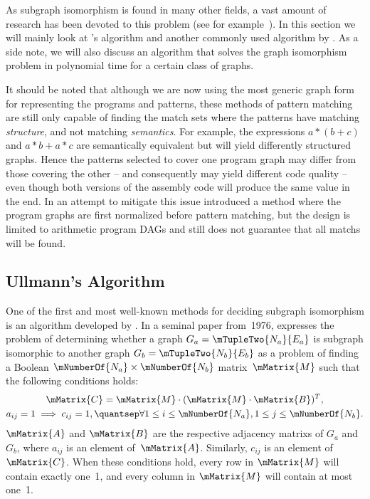 As \gls{subgraph isomorphism} is found in many other fields, a vast amount of
research has been devoted to this problem (see for
example~).
%
In this section we
will mainly look at \citeauthor{Ullmann1976}'s algorithm and another commonly
used algorithm by \citeauthor{Cordella2001}.
%
As a side note, we will also
discuss an algorithm that solves the \gls{graph isomorphism} problem in
polynomial time for a certain class of \glspl{graph}.

It should be noted that although we are now using the most generic \gls{graph}
form for representing the \glspl{program} and \glspl{pattern}, these methods of
\gls{pattern matching} are still only capable of finding the \glspl{match set}
where the \glspl{pattern} have matching \emph{structure}, and not matching
\emph{semantics}.
%
For example, the expressions \mbox{$a * (b + c)$} and \mbox{$a
  * b + a * c$} are semantically equivalent but will yield differently
structured \glspl{graph}.
%
Hence the \glspl{pattern} selected to cover one
\gls{program graph} may differ from those covering the other -- and consequently
may yield different code quality -- even though both versions of the
\gls{assembly code} will produce the same value in the end.
%
In an attempt to
mitigate this issue \textcite{Arora2010} introduced a method where the
\glspl{program graph} are first normalized before \gls{pattern matching}, but
the design is limited to arithmetic \glspl{program DAG} and still does not
guarantee that all \glspl{match} will be found.


\subsection{Ullmann's Algorithm}

One of the first and most well-known methods for deciding \gls{subgraph
  isomorphism} is an algorithm developed by \textcite{Ullmann1976}.
%
In a seminal
paper from~1976, \citeauthor{Ullmann1976} expresses the problem of determining
whether a \gls{graph} \mbox{$G_a = \mTupleTwo{N_a}{E_a}$} is \gls{subgraph}
\gls{isomorphic} to another \gls{graph} \mbox{$G_b = \mTupleTwo{N_b}{E_b}$} as a
problem of finding a Boolean \mbox{$\mNumberOf{N_a} \times \mNumberOf{N_b}$}
matrix~$\mMatrix{M}$ such that the following conditions holds:
\begin{gather*}
  \mMatrix{C} = \mMatrix{M} \cdot (\mMatrix{M} \cdot \mMatrix{B})^T,\\
  a_{ij} = 1 \implies c_{ij} = 1,
  \quantsep
  \forall 1 \leq i \leq \mNumberOf{N_a}, 1 \leq j \leq \mNumberOf{N_b}.
\end{gather*}
$\mMatrix{A}$ and $\mMatrix{B}$ are the respective \glspl{adjacency matrix} of
$G_a$ and~$G_b$, where $a_{ij}$ is an element of~$\mMatrix{A}$.
%
Similarly,
$c_{ij}$ is an element of~$\mMatrix{C}$.
%
When these conditions hold, every row
in $\mMatrix{M}$ will contain exactly one~1, and every column in $\mMatrix{M}$
will contain at most one~1.

